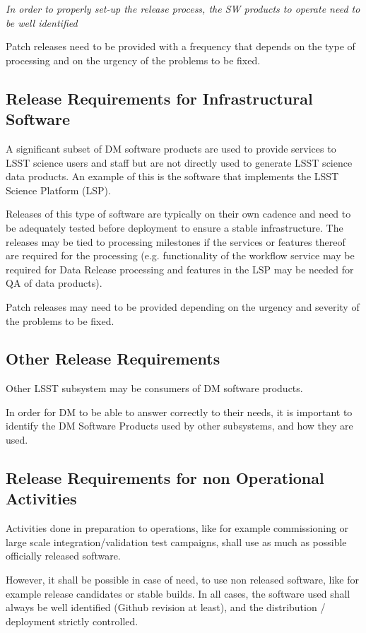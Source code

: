 \textit{In order to properly set-up the release process, the \gls{SW} products to operate need to be well identified}

Patch releases need to be provided with a frequency that depends on the type of processing
and on the urgency of the problems to be fixed.


\subsection{Release Requirements for Infrastructural Software} \label{sec:infreqs}

A significant subset of DM software products are used to provide services to LSST science users and staff but are not directly used to generate LSST science data products. An example of this is the software that implements the LSST Science Platform (LSP).

Releases of this type of software are typically on their own cadence and need to be adequately tested before deployment to ensure a stable infrastructure. The releases may be tied to processing milestones if the services or features thereof are required for the processing (e.g. functionality of the workflow service may be required for Data Release processing and features in the LSP may be needed for QA of data products).

Patch releases may need to be provided depending on the urgency and severity of the problems to be fixed.




\subsection{Other Release Requirements} \label{sec:otherreqs}

Other \gls{LSST} subsystem may be consumers of \gls{DM} software products.

In order for \gls{DM} to be able to answer correctly to their needs,
it is important to identify the \gls{DM} Software Products used by other subsystems,
and how they are used.


\subsection{Release Requirements for non Operational Activities} \label{sec:nonopsreqs}

Activities done in preparation to operations, like for example commissioning or 
large scale integration/validation test campaigns, shall use as much as possible officially released software.

However, it shall be possible in case of need, to use non released software, like for example release candidates or stable builds.
In all cases, the software used shall always be well identified (Github revision at least), and the distribution / deployment strictly controlled.






